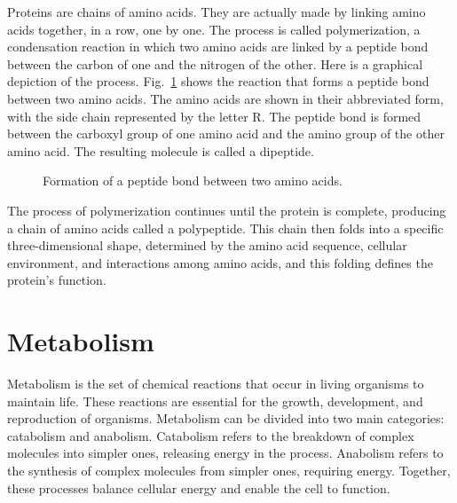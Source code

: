 Proteins are chains of amino acids. They are actually made by linking amino acids together, in a row, one by one. The process is called polymerization, a condensation reaction in which two amino acids are linked by a peptide bond between the carbon of one and the nitrogen of the other. Here is a graphical depiction of the process. Fig.~\ref{fig:peptide-bond} shows the reaction that forms a peptide bond between two amino acids. The amino acids are shown in their abbreviated form, with the side chain represented by the letter R. The peptide bond is formed between the carboxyl group of one amino acid and the amino group of the other amino acid. The resulting molecule is called a dipeptide.

\begin{figure}
    \caption[6pt]{Formation of a peptide bond between two amino acids.}
    \label{fig:peptide-bond}
\end{figure}

The process of polymerization continues until the protein is complete, producing a chain of amino acids called a polypeptide. This chain then folds into a specific three-dimensional shape, determined by the amino acid sequence, cellular environment, and interactions among amino acids, and this folding defines the protein’s function.

\section{Metabolism}

Metabolism is the set of chemical reactions that occur in living organisms to maintain life. These reactions are essential for the growth, development, and reproduction of organisms. Metabolism can be divided into two main categories: catabolism and anabolism. Catabolism refers to the breakdown of complex molecules into simpler ones, releasing energy in the process. Anabolism refers to the synthesis of complex molecules from simpler ones, requiring energy. Together, these processes balance cellular energy and enable the cell to function.

